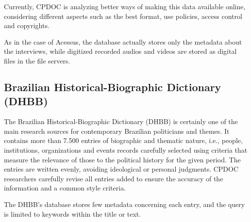 Currently, CPDOC is
analyzing better ways of making this data available online,
considering different aspects such as the best format, use policies,
access control and copyrights.

As in the case of Acessus, the database actually stores only the
metadata about the interviews, while digitized recorded audios and
videos are stored as digital files in the file servers.


\subsection{Brazilian Historical-Biographic Dictionary (DHBB)}

The Brazilian Historical-Biographic Dictionary (DHBB) is certainly one
of the main research sources for contemporary Brazilian politicians
and themes. It contains more than 7.500 entries of biographic and
thematic nature, i.e., people, institutions, organizations and events
records carefully selected using criteria that measure the relevance
of those to the political history for the given period. The entries
are written evenly, avoiding ideological or personal
judgments. CPDOC researchers carefully revise all entries added to
ensure the accuracy of the information and a common style criteria.


The DHBB's database stores few metadata concerning each entry,
and the query is limited to keywords within the title or text.



